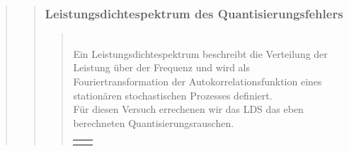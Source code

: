 \begin{quote}
\begin{quote}
\begin{quote}
        \end{quote}  %
        
        \subsubsection{Leistungsdichtespektrum des Quantisierungsfehlers}
		\begin{quote}
		
		
		 \\
		
		
		Ein Leistungsdichtespektrum beschreibt die Verteilung der Leistung über der Frequenz und wird als
		Fouriertransformation der Autokorrelationsfunktion eines stationären stochastischen Prozesses definiert.\cite{LDS}\\
		Für diesen Versuch errechenen wir das LDS das eben berechneten Quantisierungsrauschen. 

        \begin{center}
            \begin{tabular}{ll}
            
            \hspace{-4cm}
                

\end{tabular}
\end{center}
\end{quote}
\end{quote}
\end{quote}
